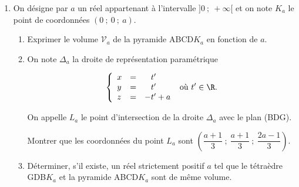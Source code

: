 \begin{enumerate}
\item On désigne par $a$ un réel appartenant à l'intervalle $]0~;~+\infty[$ et on note $K_a$ le point de coordonnées $(0~;~0~;~a)$.
	\begin{enumerate}
		\item Exprimer le volume $\mathcal{V}_a$ de la pyramide ABCD$K_a$ en fonction de $a$.
		\item On note $\Delta_a$ la droite de représentation paramétrique 

\[
\left\{\begin{array}{l c l}x&=&\phantom{-}t' \\ y &=&\phantom{-}t' \\ z&=&- t' + a \end{array}\right. \text{ où } t' \in \R. \]

On appelle $L_a$ le point d'intersection de la droite $\Delta_a$ avec le plan (BDG).

Montrer que les coordonnées du point $L_a$ sont $\left(\dfrac{a+1}{3}~;~\dfrac{a+1}{3}~;~\dfrac{2a-1}{3}\right)$.
		\item Déterminer, s'il existe, un réel strictement positif $a$ tel que le tétraèdre GDB$K_a$ et la pyramide ABCD$K_a$ sont de même volume.
	\end{enumerate}
\end{enumerate}

